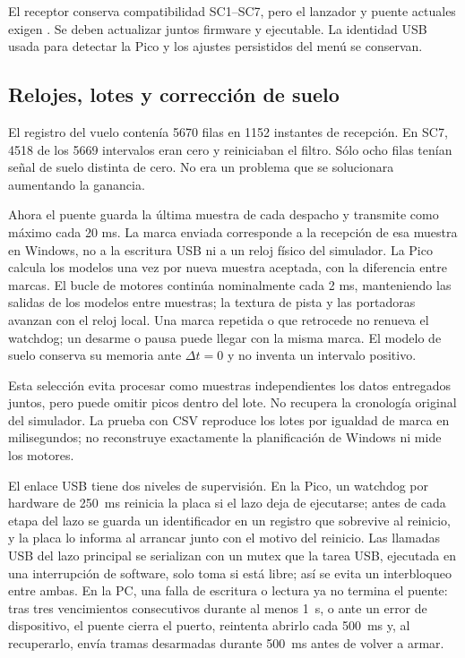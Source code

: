 El receptor conserva compatibilidad SC1--SC7, pero el lanzador y puente actuales exigen . Se deben actualizar juntos firmware y ejecutable. La identidad USB usada para detectar la Pico y los ajustes persistidos del menú se conservan.

\subsection{Relojes, lotes y corrección de suelo}
El registro del vuelo contenía 5670 filas en 1152 instantes de recepción. En SC7, 4518 de los 5669 intervalos eran cero y reiniciaban el filtro. Sólo ocho filas tenían señal de suelo distinta de cero. No era un problema que se solucionara aumentando la ganancia.

Ahora el puente guarda la última muestra de cada despacho y transmite como máximo cada 20 ms. La marca enviada corresponde a la recepción de esa muestra en Windows, no a la escritura USB ni a un reloj físico del simulador. La Pico calcula los modelos una vez por nueva muestra aceptada, con la diferencia entre marcas. El bucle de motores continúa nominalmente cada 2 ms, manteniendo las salidas de los modelos entre muestras; la textura de pista y las portadoras avanzan con el reloj local. Una marca repetida o que retrocede no renueva el watchdog; un desarme o pausa puede llegar con la misma marca. El modelo de suelo conserva su memoria ante $\Delta t=0$ y no inventa un intervalo positivo.

Esta selección evita procesar como muestras independientes los datos entregados juntos, pero puede omitir picos dentro del lote. No recupera la cronología original del simulador. La prueba con CSV reproduce los lotes por igualdad de marca en milisegundos; no reconstruye exactamente la planificación de Windows ni mide los motores.

El enlace USB tiene dos niveles de supervisión. En la Pico, un watchdog por hardware de 250~ms reinicia la placa si el lazo deja de ejecutarse; antes de cada etapa del lazo se guarda un identificador en un registro que sobrevive al reinicio, y la placa lo informa al arrancar junto con el motivo del reinicio. Las llamadas USB del lazo principal se serializan con un mutex que la tarea USB, ejecutada en una interrupción de software, solo toma si está libre; así se evita un interbloqueo entre ambas. En la PC, una falla de escritura o lectura ya no termina el puente: tras tres vencimientos consecutivos durante al menos 1~s, o ante un error de dispositivo, el puente cierra el puerto, reintenta abrirlo cada 500~ms y, al recuperarlo, envía tramas desarmadas durante 500~ms antes de volver a armar.

